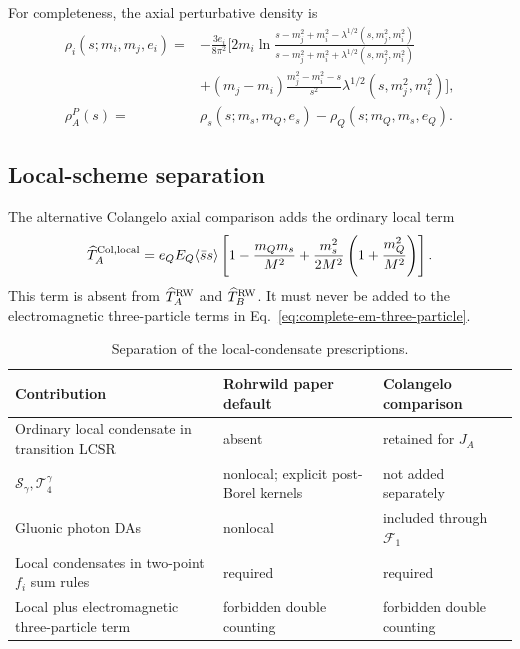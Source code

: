 \documentclass[11pt]{article}
\begin{document}
For completeness, the axial perturbative density is
\begin{align}
 \rho_i(s;m_i,m_j,e_i)={}&-\frac{3e_i}{8\pi^2}
 \Bigg[
 2m_i\ln\frac{s-m_j^2+m_i^2-\lambda^{1/2}(s,m_j^2,m_i^2)}
 {s-m_j^2+m_i^2+\lambda^{1/2}(s,m_j^2,m_i^2)}
 \nonumber\\
 &+(m_j-m_i)\frac{m_j^2-m_i^2-s}{s^2}
 \lambda^{1/2}(s,m_j^2,m_i^2)\Bigg],\nonumber\\
 \rho_A^P(s)={}&
 \rho_s(s;m_s,m_Q,e_s)-\rho_Q(s;m_Q,m_s,e_Q).
 \label{eq:axial-perturbative-density}
\end{align}

\subsection{Local-scheme separation}

The alternative Colangelo axial comparison adds the ordinary local term
\begin{equation}
 \widehat T_A^{\rm Col,local}
 =e_QE_Q\langle\bar ss\rangle
 \left[1-\frac{m_Qm_s}{M^2}
 +\frac{m_s^2}{2M^2}\left(1+\frac{m_Q^2}{M^2}\right)\right].
 \label{eq:colangelo-local-alternative}
\end{equation}
This term is absent from $\widehat T_A^{\rm RW}$ and
$\widehat T_B^{\rm RW}$.  It must never be added to the electromagnetic
three-particle terms in Eq.~\eqref{eq:complete-em-three-particle}.

\begin{table}[H]
 \centering
 \small
 \begin{tabular}{p{}p{}p{}}
  \toprule
  Contribution & Rohrwild paper default & Colangelo comparison\\
  \midrule
  Ordinary local condensate in transition LCSR & absent & retained for $J_A$\\
  $\mathcal S_\gamma,\mathcal T_4^\gamma$ & nonlocal; explicit post-Borel kernels & not added separately\\
  Gluonic photon DAs & nonlocal & included through $\mathcal F_1$\\
  Local condensates in two-point $f_i$ sum rules & required & required\\
  Local plus electromagnetic three-particle term & forbidden double counting & forbidden double counting\\
  \bottomrule
 \end{tabular}
 \caption{Separation of the local-condensate prescriptions.}
 \label{tab:local-scheme-comparison}
\end{table}
\end{document}
